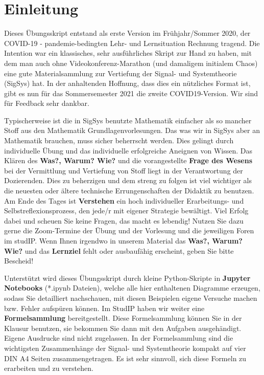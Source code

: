 \newpage
\section*{Einleitung}
%

Dieses Übungsskript entstand als erste Version im Frühjahr/Sommer 2020, der
COVID-19 - pandemie-bedingten Lehr- und Lernsituation Rechnung tragend.
%
Die Intention war ein klassisches, sehr ausführliches Skript zur Hand zu haben,
mit dem man auch ohne Videokonferenz-Marathon (und damaligem initialem Chaos)
eine gute Materialsammlung zur Vertiefung der Signal- und Systemtheorie (SigSys)
hat.
%
In der anhaltenden Hoffnung, dass dies ein nützliches Format ist, gibt es nun
für das Sommersemester 2021 die zweite COVID19-Version. Wir sind für Feedback
sehr dankbar.

Typischerweise ist die in SigSys benutzte Mathematik einfacher als so mancher
Stoff aus den Mathematik Grundlagenvorlesungen.
%
Das was wir in SigSys aber an Mathematik brauchen, muss sicher beherrscht werden.
%
Dies gelingt durch individuelle Übung und das individuelle erfolgreiche Aneignen
von Wissen.
%
Das Klären des \textbf{Was?, Warum? Wie?} und die vorangestellte
\textbf{Frage des Wesens} bei der Vermittlung und Vertiefung von Stoff liegt
in der Verantwortung der Dozierenden.
%
Dies zu beherzigen und dem streng zu folgen ist viel wichtiger als die neuesten
oder ältere technische Errungenschaften der Didaktik zu benutzen.
%
Am Ende des Tages ist \textbf{Verstehen} ein hoch individueller Erarbeitungs-
und Selbstreflexionsprozess, den jede/r mit eigener Strategie bewältigt.
%
Viel Erfolg dabei und scheuen Sie keine Fragen, das macht es lebendig!
Nutzen Sie dazu gerne die Zoom-Termine der Übung und der Vorlesung und die
jeweiligen Foren im studIP.
%
Wenn Ihnen irgendwo in unserem Material das \textbf{Was?, Warum? Wie?} und das
\textbf{Lernziel} fehlt oder ausbaufähig erscheint, geben Sie bitte Bescheid!

%
Unterstützt wird dieses Übungsskript durch kleine Python-Skripte in
\textbf{Jupyter Notebooks} (*.ipynb Dateien),
welche alle hier enthaltenen Diagramme erzeugen, sodass Sie
detailliert nachschauen, mit diesen Beispielen eigene Versuche machen
bzw. Fehler aufspüren können.
%
Im StudIP haben wir weiter eine \textbf{Formelsammlung} bereitgestellt.
%
Diese Formelsammlung können Sie in der Klausur benutzen, sie bekommen Sie
dann mit den Aufgaben ausgehändigt.
%
Eigene Ausdrucke sind nicht zugelassen.
%
In der Formelsammlung sind die wichtigsten Zusammenhänge der Signal- und
Systemtheorie kompakt auf vier DIN A4 Seiten zusammengetragen.
%
Es ist sehr sinnvoll, sich diese Formeln zu erarbeiten und zu verstehen.

